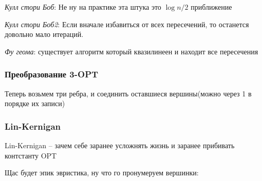 \textit{Кулл стори Боб}: Не ну на практике эта штука это 
$\log n / 2$  приближение

\textit{Кулл стори Боб2}: Если вначале избавиться от всех пересечений,
то останется довольно мало итераций.

\textit{Фу геома}: существует алгоритм который 
квазилинеен и находит все пересечения

\subsubsection*{Преобразование 3-OPT}

Теперь возьмем три ребра, и 
соединить оставшиеся вершины(можно через 1 в порядке их записи)

\subsubsection*{Lin-Kernigan}
Lin-Kernigan -- зачем себе заранее усложнять жизнь и заранее прибивать
контстанту OPT

Щас будет эпик эвристика, ну что го пронумеруем вершинки:
